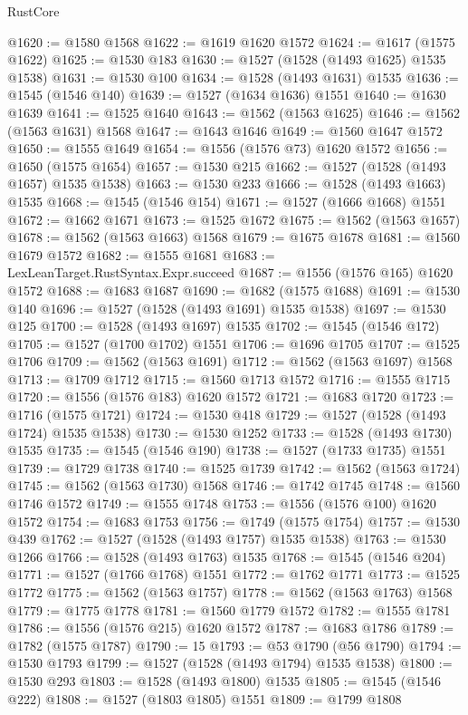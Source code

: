 \begin{lexlean}{RustCore}
\begin{coremodule}
@1620 := @1580 @1568
@1622 := @1619 @1620 @1572
@1624 := @1617 (@1575 @1622)
@1625 := @1530 @183
@1630 := @1527 (@1528 (@1493 @1625) @1535 @1538)
@1631 := @1530 @100
@1634 := @1528 (@1493 @1631) @1535
@1636 := @1545 (@1546 @140)
@1639 := @1527 (@1634 @1636) @1551
@1640 := @1630 @1639
@1641 := @1525 @1640
@1643 := @1562 (@1563 @1625)
@1646 := @1562 (@1563 @1631) @1568
@1647 := @1643 @1646
@1649 := @1560 @1647 @1572
@1650 := @1555 @1649
@1654 := @1556 (@1576 @73) @1620 @1572
@1656 := @1650 (@1575 @1654)
@1657 := @1530 @215
@1662 := @1527 (@1528 (@1493 @1657) @1535 @1538)
@1663 := @1530 @233
@1666 := @1528 (@1493 @1663) @1535
@1668 := @1545 (@1546 @154)
@1671 := @1527 (@1666 @1668) @1551
@1672 := @1662 @1671
@1673 := @1525 @1672
@1675 := @1562 (@1563 @1657)
@1678 := @1562 (@1563 @1663) @1568
@1679 := @1675 @1678
@1681 := @1560 @1679 @1572
@1682 := @1555 @1681
@1683 := LexLeanTarget.RustSyntax.Expr.succeed
@1687 := @1556 (@1576 @165) @1620 @1572
@1688 := @1683 @1687
@1690 := @1682 (@1575 @1688)
@1691 := @1530 @140
@1696 := @1527 (@1528 (@1493 @1691) @1535 @1538)
@1697 := @1530 @125
@1700 := @1528 (@1493 @1697) @1535
@1702 := @1545 (@1546 @172)
@1705 := @1527 (@1700 @1702) @1551
@1706 := @1696 @1705
@1707 := @1525 @1706
@1709 := @1562 (@1563 @1691)
@1712 := @1562 (@1563 @1697) @1568
@1713 := @1709 @1712
@1715 := @1560 @1713 @1572
@1716 := @1555 @1715
@1720 := @1556 (@1576 @183) @1620 @1572
@1721 := @1683 @1720
@1723 := @1716 (@1575 @1721)
@1724 := @1530 @418
@1729 := @1527 (@1528 (@1493 @1724) @1535 @1538)
@1730 := @1530 @1252
@1733 := @1528 (@1493 @1730) @1535
@1735 := @1545 (@1546 @190)
@1738 := @1527 (@1733 @1735) @1551
@1739 := @1729 @1738
@1740 := @1525 @1739
@1742 := @1562 (@1563 @1724)
@1745 := @1562 (@1563 @1730) @1568
@1746 := @1742 @1745
@1748 := @1560 @1746 @1572
@1749 := @1555 @1748
@1753 := @1556 (@1576 @100) @1620 @1572
@1754 := @1683 @1753
@1756 := @1749 (@1575 @1754)
@1757 := @1530 @439
@1762 := @1527 (@1528 (@1493 @1757) @1535 @1538)
@1763 := @1530 @1266
@1766 := @1528 (@1493 @1763) @1535
@1768 := @1545 (@1546 @204)
@1771 := @1527 (@1766 @1768) @1551
@1772 := @1762 @1771
@1773 := @1525 @1772
@1775 := @1562 (@1563 @1757)
@1778 := @1562 (@1563 @1763) @1568
@1779 := @1775 @1778
@1781 := @1560 @1779 @1572
@1782 := @1555 @1781
@1786 := @1556 (@1576 @215) @1620 @1572
@1787 := @1683 @1786
@1789 := @1782 (@1575 @1787)
@1790 := 15
@1793 := @53 @1790 (@56 @1790)
@1794 := @1530 @1793
@1799 := @1527 (@1528 (@1493 @1794) @1535 @1538)
@1800 := @1530 @293
@1803 := @1528 (@1493 @1800) @1535
@1805 := @1545 (@1546 @222)
@1808 := @1527 (@1803 @1805) @1551
@1809 := @1799 @1808

\end{coremodule}
\end{lexlean}
